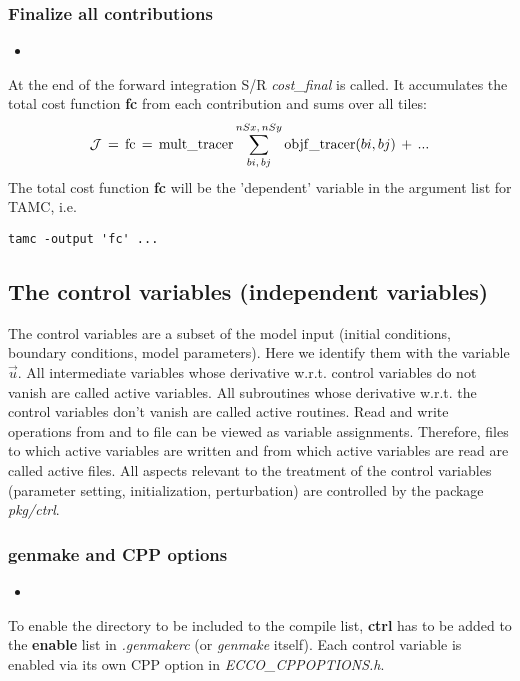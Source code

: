 \subsubsection{Finalize all contributions}
%
\begin{itemize}
%
\item 
{}
\end{itemize}
%
At the end of the forward integration S/R {\it cost\_final}
is called. It accumulates the total cost function {\bf fc}
from each contribution and sums over all tiles:
\begin{equation}
{\cal J} \, = \, 
{\rm fc} \, = \, 
{\rm mult\_tracer} \sum_{bi,\,bj}^{nSx,\,nSy}
{\rm objf\_tracer}(bi,bj) \, + \, ...
\end{equation}
%
The total cost function {\bf fc} will be the
'dependent' variable in the argument list for TAMC, i.e.
\begin{verbatim}
tamc -output 'fc' ...
\end{verbatim}




\subsection{The control variables (independent variables)
\label{section_ctrl}}

The control variables are a subset of the model input
(initial conditions, boundary conditions, model parameters).
Here we identify them with the variable $ \vec{u} $.
All intermediate variables whose derivative w.r.t. control
variables do not vanish are called {\sf active variables}.
All subroutines whose derivative w.r.t. the control variables
don't vanish are called {\sf active routines}.
Read and write operations from and to file can be viewed
as variable assignments. Therefore, files to which
active variables are written and from which active variables
are read are called {\sf active files}.
All aspects relevant to the treatment of the control variables
(parameter setting, initialization, perturbation)
are controlled by the package {\it pkg/ctrl}.



\subsubsection{genmake and CPP options}
%
\begin{itemize}
%
\item 
{}
\end{itemize}
%
To enable the directory to be included to the compile list,
{\bf ctrl} has to be added to the {\bf enable} list in
{\it .genmakerc} (or {\it genmake} itself).
Each control variable is enabled via its own CPP option
in {\it ECCO\_CPPOPTIONS.h}.

